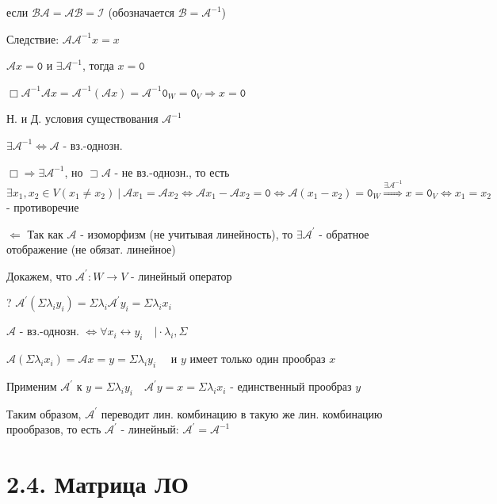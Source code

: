 \documentclass[12pt]{article}
\begin{document}
    если $\mathcal{B}\mathcal{A} = \mathcal{A}\mathcal{B} = \mathcal{I}$ (обозначается $\mathcal{B} = \mathcal{A}^{-1}$)

    Следствие: $\mathcal{A}\mathcal{A}^{-1} x = x$

    \Th $\mathcal{A}x = \texttt{0}$ и $\exists \mathcal{A}^{-1}$, тогда $x = \texttt{0}$

    $\Box \mathcal{A}^{-1}\mathcal{A} x = \mathcal{A}^{-1}(\mathcal{A} x) = \mathcal{A}^{-1} \texttt{0}_W = \texttt{0}_V \Longrightarrow x = \texttt{0}$

    \Th Н. и Д. условия существования $\mathcal{A}^{-1}$

    $\exists \mathcal{A}^{-1} \Longleftrightarrow \mathcal{A}$ - вз.-однозн.

    $\Box \Longrightarrow \exists \mathcal{A}^{-1}$, но $\sqsupset \mathcal{A}$ - не вз.-однозн., то есть
    $\exists x_1, x_2 \in V (x_1 \neq x_2) \ | \ \mathcal{A}x_1 = \mathcal{A}x_2 \Longleftrightarrow \mathcal{A}x_1 - \mathcal{A}x_2 = \texttt{0} \Longleftrightarrow
    \mathcal{A}(x_1 - x_2) = \texttt{0}_W \stackrel{\exists \mathcal{A}^{-1}}{\Longrightarrow} x = \texttt{0}_V \Longleftrightarrow x_1 = x_2$ - противоречие

    $\Longleftarrow$ Так как $\mathcal{A}$ - изоморфизм (не учитывая линейность), то $\exists \mathcal{A}^\prime$ - обратное отображение (не обязат. линейное)

    Докажем, что $\mathcal{A}^\prime : W \rightarrow V$ - линейный оператор

    ? $\mathcal{A}^\prime (\Sigma \lambda_i y_i) = \Sigma \lambda_i \mathcal{A}^\prime y_i = \Sigma \lambda_i x_i$

    $\mathcal{A}$ - вз.-однозн. $\Longleftrightarrow \forall x_i \longleftrightarrow y_i \quad \Big| \cdot \lambda_i, \Sigma$

    $\mathcal{A}(\Sigma \lambda_i x_i) = \mathcal{A} x = y = \Sigma \lambda_i y_i \quad$ и $y$ имеет только один прообраз $x$

    Применим $\mathcal{A}^\prime$ к $y = \Sigma \lambda_i y_i \quad \mathcal{A}^\prime y = x = \Sigma \lambda_i x_i$ - единственный прообраз $y$

    Таким образом, $\mathcal{A}^\prime$ переводит лин. комбинацию в такую же лин. комбинацию прообразов, то есть $\mathcal{A}^\prime$ - линейный: $\mathcal{A}^\prime = \mathcal{A}^{-1}$

    \section{2.4. Матрица ЛО}
\end{document}
